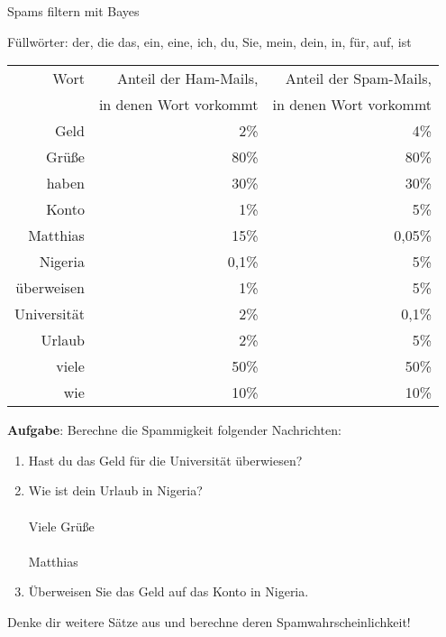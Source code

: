 \documentclass{article}
\begin{document}
  \begin{center}
    \huge Spams filtern mit Bayes
  \end{center}
  \vspace{3em}

  \small
  Füllwörter: der, die das, ein, eine, ich, du, Sie, mein, dein, in, für, auf, ist

  \begin{center}\begin{tabular}{r | r | r}
    Wort & Anteil der Ham-Mails, & Anteil der Spam-Mails, \\
         & in denen Wort vorkommt & in denen Wort vorkommt \\[0.5em] \hline
    Geld & 2\% & 4\% \\
    Grüße & 80\% & 80\% \\
    haben & 30\% & 30\% \\
    Konto & 1\% & 5\% \\
    Matthias & 15\% & 0,05\% \\
    Nigeria & 0,1\% & 5\% \\
    überweisen & 1\% & 5\% \\
    Universität & 2\% & 0,1\% \\
    Urlaub & 2\% & 5\% \\
    viele & 50\% & 50\% \\
    wie & 10\% & 10\% \\
  \end{tabular}\end{center}

  \vspace{4em}

  \textbf{Aufgabe}: \enspace Berechne die Spammigkeit folgender Nachrichten: \\[2em]

  \begin{enumerate}
    \item Hast du das Geld für die Universität überwiesen? \\[2em]
    \item Wie ist dein Urlaub in Nigeria? \\\\ Viele Grüße \\\\ Matthias \\[2em]
    \item Überweisen Sie das Geld auf das Konto in Nigeria. \\[2em]
  \end{enumerate}

  Denke dir weitere Sätze aus und berechne deren Spamwahrscheinlichkeit!
\end{document}
